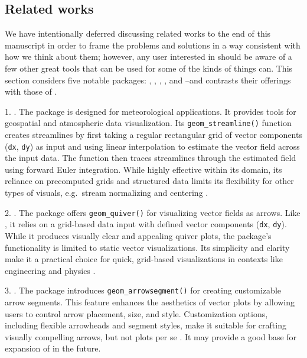 \subsection{Related works}\label{sec:related}

We have intentionally deferred discussing related works to the end of this manuscript in order to frame the problems and solutions in a way consistent with how we think about them; however, any user interested in  should be aware of a few other great tools that can be used for some of the kinds of things  can. This section considers five notable packages: , , , , and --and contrasts their offerings with those of .

1. . The  package is designed for meteorological applications. It provides tools for geospatial and atmospheric data visualization. Its \texttt{geom\_streamline()} function creates streamlines by first taking a regular rectangular grid of vector components (\texttt{dx}, \texttt{dy}) as input and using linear interpolation to estimate the vector field across the input data. The function then traces streamlines through the estimated field using forward Euler integration. While highly effective within its domain, its reliance on precomputed grids and structured data limits its flexibility for other types of visuals, e.g.~stream normalizing and centering \citep{metR}.

2. . The  package offers \texttt{geom\_quiver()} for visualizing vector fields as arrows. Like , it relies on a grid-based data input with defined vector components (\texttt{dx}, \texttt{dy}). While it produces visually clear and appealing quiver plots, the package's functionality is limited to static vector visualizations. Its simplicity and clarity make it a practical choice for quick, grid-based visualizations in contexts like engineering and physics \citep{ggquiver}.

3. . The  package introduces \texttt{geom\_arrowsegment()} for creating customizable arrow segments. This feature enhances the aesthetics of vector plots by allowing users to control arrow placement, size, and style. Customization options, including flexible arrowheads and segment styles, make it suitable for crafting visually compelling arrows, but not plots per se \citep{ggarchery}. It may provide a good base for expansion of  in the future.

